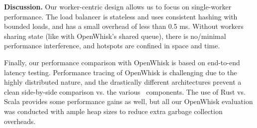 



\noindent \textbf{Discussion.}
Our worker-centric design allows us to focus on single-worker performance. 
The load balancer is stateless and uses consistent hashing with bounded loads, and has a small overhead of less than 0.5 ms. 
Without workers sharing state (like with OpenWhisk's shared queue), there is no/minimal performance interference, and hotspots are confined in space and time.

Finally, our performance comparison with OpenWhisk is based on end-to-end latency testing. 
Performance tracing of OpenWhisk is challenging due to the highly distributed nature, and the drastically different architectures prevent a clean side-by-side comparison vs. the various \sysname~components.
The use of Rust vs. Scala provides some performance gains as well, but all our OpenWhisk evaluation was conducted with ample heap sizes to reduce extra garbage collection overheads. 

